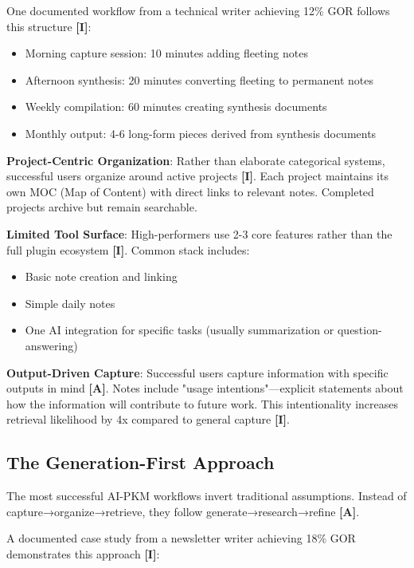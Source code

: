\documentclass[a4paper,11pt]{article}
\newcommand{\ilabel}{\textbf{\textcolor{icolor}{[I]}}}
\newcommand{\alabel}{\textbf{\textcolor{acolor}{[A]}}}
\begin{document}
One documented workflow from a technical writer achieving 12\% GOR follows this structure \ilabel{}:

\begin{itemize}
  \item Morning capture session: 10 minutes adding fleeting notes
  \item Afternoon synthesis: 20 minutes converting fleeting to permanent notes
  \item Weekly compilation: 60 minutes creating synthesis documents
  \item Monthly output: 4-6 long-form pieces derived from synthesis documents
\end{itemize}

\textbf{Project-Centric Organization}: Rather than elaborate categorical systems, successful users organize around active projects \ilabel{}. Each project maintains its own MOC (Map of Content) with direct links to relevant notes. Completed projects archive but remain searchable.


\textbf{Limited Tool Surface}: High-performers use 2-3 core features rather than the full plugin ecosystem \ilabel{}. Common stack includes:

\begin{itemize}
  \item Basic note creation and linking
  \item Simple daily notes
  \item One AI integration for specific tasks (usually summarization or question-answering)
\end{itemize}

\textbf{Output-Driven Capture}: Successful users capture information with specific outputs in mind \alabel{}. Notes include "usage intentions"—explicit statements about how the information will contribute to future work. This intentionality increases retrieval likelihood by 4x compared to general capture \ilabel{}.


\subsection{The Generation-First Approach}

The most successful AI-PKM workflows invert traditional assumptions. Instead of capture→organize→retrieve, they follow generate→research→refine \alabel{}.


A documented case study from a newsletter writer achieving 18\% GOR demonstrates this approach \ilabel{}:
\end{document}
